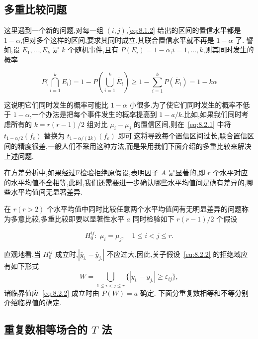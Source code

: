 \subsection{多重比较问题}

这里遇到一个新的问题,对每一组 $(i, j)$,\eqref{eq:8.1.2} 给出的区间的置信水平都是 $1-\alpha$,但对多个这样的区间,要求其同时成立,其联合置信水平就不再是  $1-\alpha$ 了. 譬如,设 $E_1,\ldots, E_k$ 是 $k$ 个随机事件,且有 $P(E_i)=1-\alpha$,$i=1,\ldots, k$,则其同时发生的概率 

\begin{equation}
  P\big(\bigcap_{i=1}^{k} E_{i}\big)=1-P\left(\bigcup_{i=1}^{k} \bar{E}_{i}\right) \geqslant 1-\sum_{i=1}^{k} P\left(\bar{E}_{i}\right)=1-k \alpha
\end{equation}

这说明它们同时发生的概率可能比 $1-\alpha$ 小很多.为了使它们同时发生的概率不低于 $1-\alpha$,一个办法是把每个事件发生的概率提高到 $1-a/k$.比如,如果我们同时考虑所有的 $k = r(r-1)/2$ 组对比 $\mu_i - \mu_j$ 的置信区间,则在~\eqref{eq:8.2.1} 中将 $t_{1-\alpha/2}(f_e)$ 替换为 $t_{1-\alpha/(2k)}(f_e)$ 即可.这将导致每个置信区间过长,联合置信区间的精度很差,一般人们不采用这种方法,而是采用我们下面介绍的多重比较来解决上述问题.

在方差分析中,如果经过F检验拒绝原假设,表明因子 $A$ 是显著的,即 $r$ 个水平对应的水平均值不全相等,此时,我们还需要进一步确认哪些水平均值间是确有差异的,哪些水平均值间无显著差异. 

在 $r(r>2)$ 个水平均值中同时比较任意两个水平均值间有无明显差异的问题称为多意比较,多重比较即要以显著性水平 $a$ 同时检验如下 $r(r-1)/2$ 个假设

\begin{equation}\label{eq:8.2.2}
  H_{0}^{ij}:\; \mu_i = \mu_j,\quad 1 \leq i < j \leq r.
\end{equation}

直观地看,当 $H_{0}^{ij}$ 成立时,$|\bar{y}_{i.} - \bar{y}_{j.}|$ 不应过大,因此,关子假设~\eqref{eq:8.2.2} 的拒绝域应有如下形式
\begin{equation*}
  W = \bigcup_{1\leq i < j \leq r}\{|\bar{y}_{i.} - \bar{y}_{j.}| \geq \varepsilon_{ij}\},
\end{equation*}
诸临界值应~\eqref{eq:8.2.2} 成立时由 $P(W)=a$ 确定. 下面分重复数相等和不等分别介绍临界值的确定.

\subsection[重复数相等场合的 T 法]{重复数相等场合的 $T$ 法}

